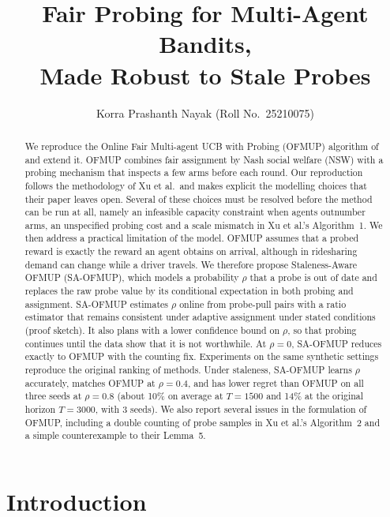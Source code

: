 \documentclass[letterpaper]{article}
\title{Fair Probing for Multi-Agent Bandits,\\ Made Robust to Stale Probes}
\author{Korra Prashanth Nayak (Roll No.\ 25210075)}
\begin{document}
\maketitle

\begin{abstract}
We reproduce the Online Fair Multi-agent UCB with Probing (OFMUP) algorithm of
\citet{xu2026fair} and extend it. OFMUP combines fair assignment by Nash social
welfare (NSW) with a probing mechanism that inspects a few arms before each
round. Our reproduction follows the methodology of Xu et al.\ and makes explicit
the modelling choices that their paper leaves open. Several of these choices
must be resolved before the method can be run at all, namely an infeasible
capacity constraint when agents outnumber arms, an unspecified probing cost and
a scale mismatch in Xu et al.'s Algorithm~1. We then address a practical
limitation of the model. OFMUP assumes that a probed reward is exactly the
reward an agent obtains on arrival, although in ridesharing demand can change
while a driver travels. We therefore propose Staleness-Aware OFMUP (SA-OFMUP),
which models a probability $\rho$ that a probe is out of date and replaces the
raw probe value by its conditional expectation in both probing and assignment.
SA-OFMUP estimates $\rho$ online from probe-pull pairs with a ratio estimator
that remains consistent under adaptive assignment under stated conditions
(proof sketch). It also plans with a lower confidence bound on $\rho$, so that
probing continues until the data show that it is not worthwhile. At $\rho=0$,
SA-OFMUP reduces exactly to OFMUP with the counting fix. Experiments on the same
synthetic settings reproduce the original ranking of methods. Under staleness,
SA-OFMUP learns $\rho$ accurately, matches OFMUP at $\rho=0.4$, and has lower
regret than OFMUP on all three seeds at $\rho=0.8$ (about 10\% on average at
$T=1500$ and 14\% at the original horizon $T=3000$, with 3 seeds). We also report
several issues in the formulation of OFMUP, including a double counting of probe
samples in Xu et al.'s Algorithm~2 and a simple counterexample to their Lemma~5.
\end{abstract}

\section{Introduction}
\end{document}
